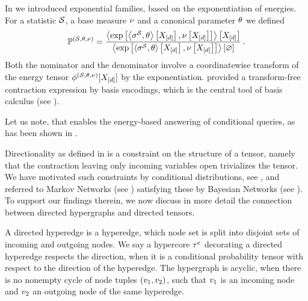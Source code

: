 \begin{example}
    In  we introduced exponential families, based on the exponentiation of energies.
    For a statistic $\mathcal{S}$, a base measure $\nu$ and a canonical parameter $\theta$ we defined
    \begin{align*}
        \mathbb{P}^{(\mathcal{S},\theta,\nu)} = \frac{
            \left\langle \mathrm{exp}\left[\left\langle \sigma^{\mathcal{S}},\theta\right\rangle \left[ X_{[d]} \right],\nu\left[X_{[d]}\right]\right]\right\rangle \left[ X_{[d]} \right]
        }{
            \left\langle \mathrm{exp}\left[\left\langle \sigma^{\mathcal{S}},\theta\right\rangle \left[ X_{[d]} \right],\nu\left[X_{[d]}\right]\right]\right\rangle \left[ \varnothing \right]
        } \, .
    \end{align*}
    Both the nominator and the denominator involve a coordinatewise transform of the energy tensor $\phi^{(\mathcal{S},\theta,\nu)}[X_{[d]}]$ by the exponentiation.
     provided a transform-free contraction expression by basis encodings, which is the central tool of basis calculus (see ).

    Let us note, that  enables the energy-based answering of conditional queries, as has been shown in .
\end{example}





Directionality as defined in  is a constraint on the structure of a tensor, namely that the contraction leaving only incoming variables open trivializes the tensor.
We have motivated such constraints by conditional distributions, see , and referred to Markov Networks (see ) satisfying these by Bayesian Networks (see ).
To support our findings therein, we now discuss in more detail the connection between directed hypergraphs and directed tensors.

\begin{definition}
    A directed hyperedge is a hyperedge, which node set is split into disjoint sets of incoming and outgoing nodes.
    We say a hypercore $\tau^{e}$ decorating a directed hyperedge respects the direction, when it is a conditional probability tensor with respect to the direction of the hyperedge.
    The hypergraph is acyclic, when there is no nonempty cycle of node tuples $(v_1,v_2)$, such that $v_1$ is an incoming node and $v_2$ an outgoing node of the same hyperedge.
\end{definition}


